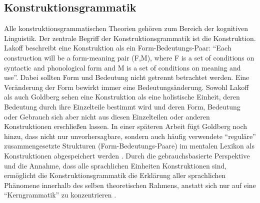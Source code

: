


\subsection{Konstruktionsgrammatik}
Alle konstruktionsgrammatischen Theorien gehören zum Bereich der kognitiven Linguistik.
Der zentrale Begriff der Konstruktionsgrammatik ist die Konstruktion.
Lakoff beschreibt eine Konstruktion als ein Form-Bedeutungs-Paar:
``Each construction will be a form-meaning pair (F,M), where F is a set of conditions on syntactic and phonological form and M is a set of conditions on meaning and use''\cite[S. 467]{Lakoff87}.
Dabei sollten Form und Bedeutung nicht getrennt betrachtet werden.
Eine Veränderung der Form bewirkt immer eine Bedeutungsänderung.
Sowohl Lakoff \cite[S.465]{Lakoff87} als auch Goldberg \cite[S.4]{Goldberg95} sehen eine Konstruktion als eine holistische Einheit, deren Bedeutung durch ihre Einzelteile bestimmt wird und deren Form, Bedeutung oder Gebrauch sich aber nicht aus diesen Einzelteilen oder anderen Konstruktionen erschließen lassen.
In einer späteren Arbeit fügt Goldberg noch hinzu, dass nicht nur unvorhersagbare, sondern auch häufig verwendete ``reguläre'' zusammengesetzte Strukturen (Form-Bedeutungs-Paare) im mentalen Lexikon als Konstruktionen abgespeichert werden \cite[vgl.][S.64]{Goldberg06}.
Durch die gebrauchsbasierte Perspektive und die Annahme, dass alle sprachlichen Einheiten Konstruktionen sind, ermöglicht die Konstruktionsgrammatik die Erklärung aller sprachlichen Phänomene innerhalb des selben theoretischen Rahmens,
anstatt sich nur auf eine ``Kerngrammatik'' zu konzentrieren \cite[vgl.][S.21]{Tomasello06}.


